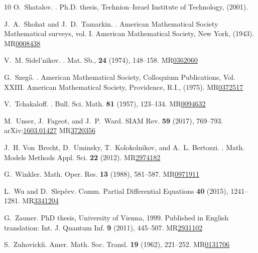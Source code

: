\documentclass[11pt, leqno]{amsart}
\def\arXiv#1{arXiv:\href{http://arXiv.org/abs/#1}{#1}}
\def\MR#1{MR\href{http://www.ams.org/mathscinet-getitem?mr=#1}{#1}}
\theoremstyle{definition}
\numberwithin{equation}{section}
\begin{document}
\begin{thebibliography}{10}
O.~Shatalov.
.
\newblock Ph.D. thesis, Technion--Israel Institute of Technology, (2001).

J.~A.~Shohat and J.~D.~Tamarkin.
.
\newblock American Mathematical Society Mathematical surveys, vol. I. American Mathematical Society, New York, (1943).
\MR{0008438}

V.~M. Sidel'nikov.
.
\newblock  Mat. Sb., {\bf 24} (1974), 148--158.
\MR{0362060}

G.~Szeg{\H{o}}.
.
\newblock American Mathematical Society, Colloquium Publications, Vol. XXIII. American Mathematical Society, Providence, R.I., (1975).
\MR{0372517}

V.~Tchakaloff.
.
\newblock Bull. Sci. Math. {\bf 81} (1957), 123--134.
\MR{0094632}

M.~Unser, J.~Fageot, and J.~P.~Ward.
\newblock SIAM Rev. {\bf 59} (2017), 769--793. 
\arXiv{1603.01427}
\MR{3720356}

J.~H. Von~Brecht, D.~Uminsky, T.~Kolokolnikov, and A.~L. Bertozzi.
.
\newblock Math. Models Methods Appl. Sci. {\bf 22} (2012).
\MR{2974182}

G.~Winkler.
\newblock Math. Oper. Res. {\bf 13} (1988), 581--587.
\MR{0971911}

L.~Wu and D.~Slep{\v{c}}ev.
\newblock Comm. Partial Differential Equations {\bf 40} (2015), 1241--1281.
\MR{3341204}

G.~Zauner.
\newblock PhD thesis, University of Vienna, 1999.
\newblock Published in English translation: Int. J. Quantum Inf. {\bf 9} (2011), 445--507.
\MR{2931102}

S.~Zuhovicki\u{\i}.
\newblock Amer. Math. Soc. Transl. {\bf 19} (1962), 221--252.
\MR{0131706}


\end{thebibliography}
\end{document}

